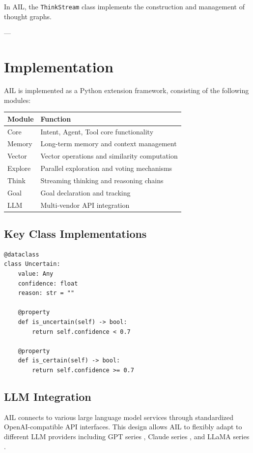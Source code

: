 \documentclass[12pt,a4paper]{article}
\begin{document}
In AIL, the \texttt{ThinkStream} class implements the construction and management of thought graphs.

---

\section{Implementation}

AIL is implemented as a Python extension framework, consisting of the following modules:

\begin{table}[htbp]
\centering
\begin{tabular}{ll}
\toprule
Module & Function \\
\midrule
Core & Intent, Agent, Tool core functionality \\
Memory & Long-term memory and context management \\
Vector & Vector operations and similarity computation \\
Explore & Parallel exploration and voting mechanisms \\
Think & Streaming thinking and reasoning chains \\
Goal & Goal declaration and tracking \\
LLM & Multi-vendor API integration \\
\bottomrule
\end{tabular}
\end{table}

\subsection{Key Class Implementations}

\begin{verbatim}
@dataclass
class Uncertain:
    value: Any
    confidence: float
    reason: str = ""
    
    @property
    def is_uncertain(self) -> bool:
        return self.confidence < 0.7
    
    @property
    def is_certain(self) -> bool:
        return self.confidence >= 0.7
\end{verbatim}

\subsection{LLM Integration}

AIL connects to various large language model services through standardized OpenAI-compatible API interfaces. This design allows AIL to flexibly adapt to different LLM providers including GPT series \cite{openai2024gpt4}, Claude series \cite{anthropic2024claude}, and LLaMA series \cite{touvron2023llama}.
\end{document}
